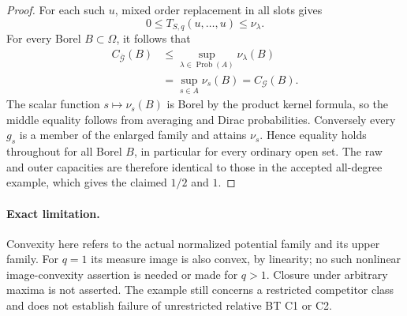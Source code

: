 \documentclass[11pt,a4paper]{article}
\numberwithin{equation}{section}
\theoremstyle{definition}
\theoremstyle{remark}
\begin{document}
\begin{proof}
For each such $u$, mixed order replacement in all slots gives
\[
              0\le T_{S,q}(u,\ldots,u)\le\nu_\lambda.
\]
For every Borel $B\subset\Omega$, it follows that
\[
 \begin{split}
 C_{\overline{\mathscr G}}(B)
   &\le\sup_{\lambda\in\operatorname{Prob}(A)}\nu_\lambda(B)\\
   &=\sup_{s\in A}\nu_s(B)
    =C_{\mathscr G}(B).
 \end{split}
\]
The scalar function $s\mapsto\nu_s(B)$ is Borel by the product
kernel formula, so the middle equality follows from averaging and
Dirac probabilities. Conversely every $g_s$ is a member of the
enlarged family and attains $\nu_s$. Hence equality holds throughout
for all Borel $B$, in particular for every ordinary open set. The
raw and outer capacities are therefore identical to those in the
accepted all-degree example, which gives the claimed $1/2$ and $1$.
\end{proof}

\paragraph{Exact limitation.}
Convexity here refers to the actual normalized potential family and
its upper family. For $q=1$ its measure image is also convex, by
linearity; no such nonlinear image-convexity assertion is needed or
made for $q>1$. Closure under arbitrary maxima is not asserted.
The example still concerns a restricted competitor class and does
not establish failure of unrestricted relative BT C1 or C2.

\end{document}
